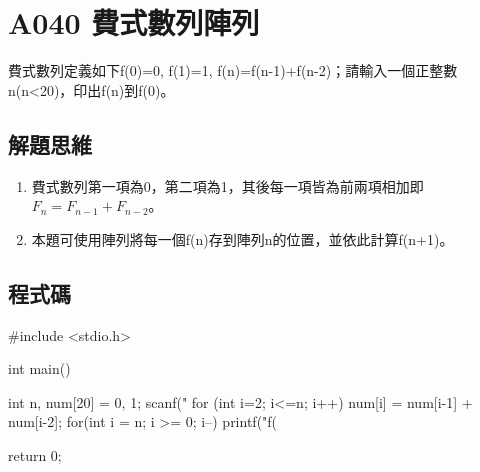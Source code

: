\section{A040 費式數列陣列}
費式數列定義如下f(0)=0, f(1)=1, f(n)=f(n-1)+f(n-2)；請輸入一個正整數n(n<20)，印出f(n)到f(0)。
\subsection{解題思維}

\begin{enumerate}
	\item
	費式數列第一項為0，第二項為1，其後每一項皆為前兩項相加即$F_{n}=F_{n-1}+F_{n-2}$。
	\item 本題可使用陣列將每一個f(n)存到陣列n的位置，並依此計算f(n+1)。
\end{enumerate} 

\subsection{程式碼}
\begin{cppcode}
	#include <stdio.h>
	
	int main()
	{
		int n, num[20] = {0, 1};
		scanf("%
		for (int i=2; i<=n; i++) num[i] = num[i-1] + num[i-2];
		for(int i = n; i >= 0; i--) {
			printf("f(%
		}
		
		return 0;
	}
\end{cppcode}
